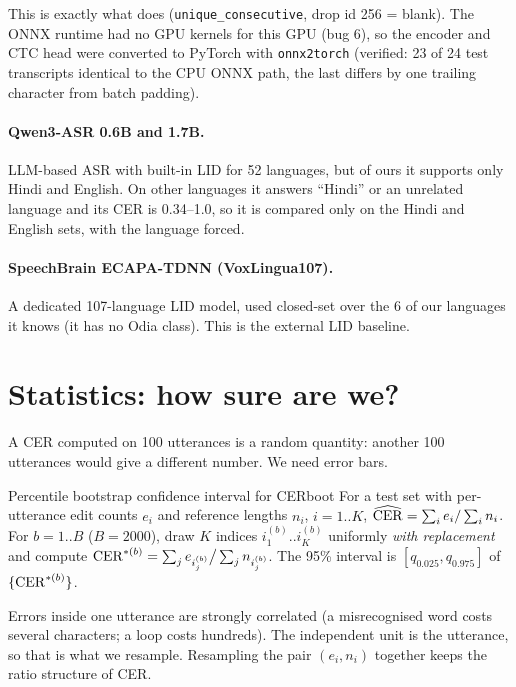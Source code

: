 This is exactly what  does (\texttt{unique\_consecutive}, drop id 256 = blank). The ONNX runtime had no GPU kernels
for this GPU (bug 6), so the encoder and CTC head were converted to PyTorch with \texttt{onnx2torch} (verified: 23 of 24 test
transcripts identical to the CPU ONNX path, the last differs by one trailing character from batch padding).

\paragraph{Qwen3-ASR 0.6B and 1.7B.} LLM-based ASR with built-in LID for 52 languages, but of ours it supports only Hindi and
English. On other languages it answers ``Hindi'' or an unrelated language and its CER is 0.34--1.0, so it is compared only on the
Hindi and English sets, with the language forced.

\paragraph{SpeechBrain ECAPA-TDNN (VoxLingua107).} A dedicated 107-language LID model, used closed-set over the 6 of our languages it
knows (it has no Odia class). This is the external LID baseline.

\section{Statistics: how sure are we?}

A CER computed on 100 utterances is a random quantity: another 100 utterances would give a different number. We need error bars.

\begin{definition}{Percentile bootstrap confidence interval for CER}{boot}
For a test set with per-utterance edit counts $e_i$ and reference lengths $n_i$, $i=1..K$, $\widehat{\operatorname{CER}}=\sum_ie_i/\sum_in_i$.
For $b=1..B$ ($B=2000$), draw $K$ indices $i^{(b)}_1..i^{(b)}_K$ uniformly \emph{with replacement} and compute
$\operatorname{CER}^{*(b)}=\sum_je_{i^{(b)}_j}\big/\sum_jn_{i^{(b)}_j}$. The 95\% interval is $[q_{0.025},q_{0.975}]$ of
$\{\operatorname{CER}^{*(b)}\}$.
\end{definition}

\begin{intuition}
Errors inside one utterance are strongly correlated (a misrecognised word costs several characters; a loop costs hundreds). The
independent unit is the utterance, so that is what we resample. Resampling the pair $(e_i,n_i)$ together keeps the ratio structure
of CER.
\end{intuition}

